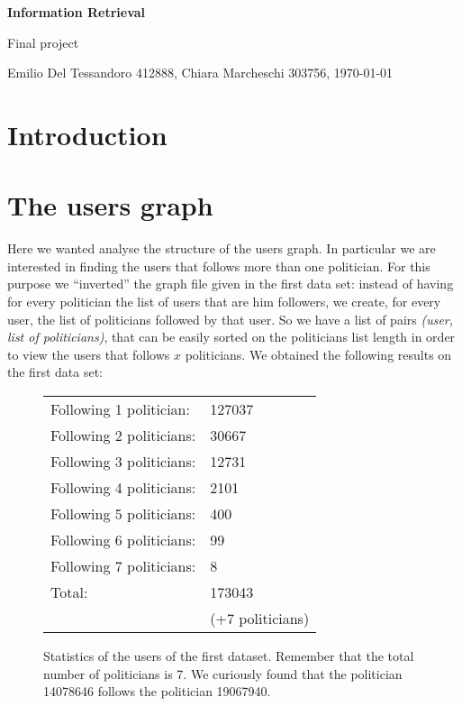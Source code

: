 \documentclass[a4paper,11pt,oneside]{article}
\begin{document}
\begin{center}\begin{huge}\textbf{Information Retrieval}\end{huge}
\medskip 

\begin{huge}Final project\end{huge}
\bigskip 

\begin{large}
Emilio Del Tessandoro 412888, Chiara Marcheschi 303756, \today
\end{large}
\end{center}


\section{Introduction}
\label{sec:intro}


\section{The users graph}
Here we wanted analyse the structure of the users graph. In particular we are interested in finding the users that follows more than one politician. For this purpose we ``inverted'' the graph file given in the first data set: instead of having for every politician the list of users that are him followers, we create, for every user, the list of politicians followed by that user.
So we have a list of pairs \textit{(user, list of politicians)}, that can be easily sorted on the politicians list length in order to view the users that follows $x$ politicians. We obtained the following results on the first data set:

\begin{figure}[h]
\begin{center}
	\begin{tabular}{l | l}
	Following 1 politician: & 127037\\ %
	Following 2 politicians: & 30667\\ %
	Following 3 politicians: & 12731\\ %
	Following 4 politicians: & 2101\\ %
	Following 5 politicians: & 400\\ %
	Following 6 politicians: & 99\\ %
	Following 7 politicians: & 8\\ \hline
	Total:	 & 173043 \\
	& (+7 politicians)\\ %
	\end{tabular}
\end{center}
\caption{Statistics of the users of the first dataset. Remember that the total number of politicians is 7. We curiously found that the politician 14078646 follows the politician 19067940.}
\end{figure}
\end{document}
